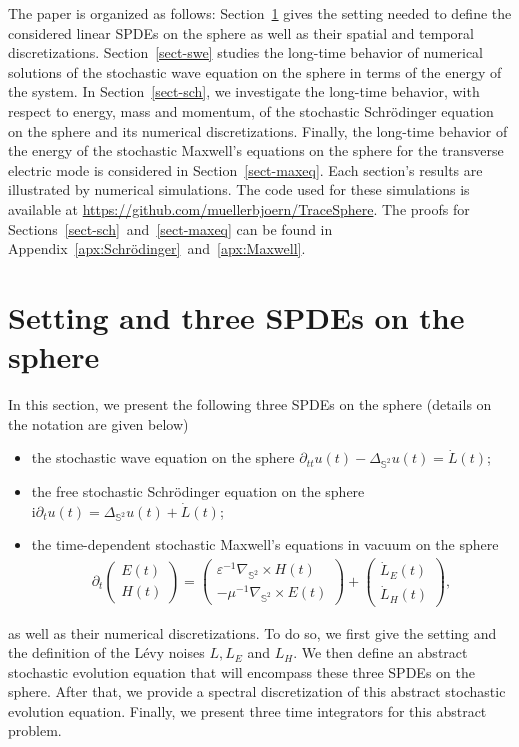 \documentclass[11pt]{amsart}
\newcommand{\ii}{\ensuremath{\mathrm{i}}}
\newcommand{\IS}{\mathbb{S}}
\newcommand{\Deltalb}{\Delta_{\IS^2}}
\newcommand{\nablalb}{\nabla_{\IS^{2}}}
\begin{document}
The paper is organized as follows: Section~\ref{sect-setting} gives the setting needed to define
the considered linear SPDEs on the sphere as well as their spatial and temporal discretizations.
Section~\ref{sect-swe} studies the long-time behavior of numerical solutions of the stochastic wave equation on the sphere in terms of
the energy of the system. In Section~\ref{sect-sch}, we investigate the long-time behavior, with respect to energy, mass and momentum,
of the stochastic Schr\"odinger equation on the sphere and its numerical discretizations. Finally, the long-time behavior of the energy of the stochastic Maxwell's equations on the sphere for the transverse electric mode is considered in Section~\ref{sect-maxeq}.
Each section's results are illustrated by numerical simulations. The code used for these simulations is available at \href{https://github.com/muellerbjoern/TraceSphere}{https://github.com/muellerbjoern/TraceSphere}.
The proofs for Sections~\ref{sect-sch}~and~\ref{sect-maxeq} can be found in Appendix~\ref{apx:Schrödinger}~and~\ref{apx:Maxwell}.

\section{Setting and three SPDEs on the sphere}\label{sect-setting}

In this section, we present the following three SPDEs on the sphere
(details on the notation are given below)
\begin{itemize}
\item the stochastic wave equation on the sphere 
$\partial_{tt}u(t)-\Deltalb u(t)=\dot{L}(t)$;
\item the free stochastic Schr\"odinger equation
on the sphere $\ii\partial_tu(t)=\Deltalb u(t)+\dot L(t)$;
\item the time-dependent stochastic Maxwell's equations in vacuum on the sphere
\begin{align*}
	\partial_t \begin{pmatrix}
		E(t) \\ H(t)
	\end{pmatrix} = \begin{pmatrix}
		\varepsilon^{-1}\nablalb \times H(t) \\ -\mu^{-1}\nablalb \times E(t)
	\end{pmatrix} + \begin{pmatrix} \dot{L}_E(t) \\ \dot{L}_H(t)\end{pmatrix},
\end{align*}
\end{itemize}
as well as their numerical discretizations. To do so, we first give
the setting and the definition of the L\'evy noises $L, L_E$ and $L_H$. 
We then 
define an abstract stochastic evolution equation that will encompass these three SPDEs on the sphere. After that, we provide a spectral discretization of this abstract stochastic evolution equation. Finally, we present three time integrators for this abstract problem.
\end{document}
